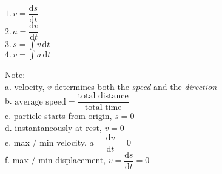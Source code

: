 \documentclass[10pt,landscape]{article}
\begin{document}
\begin{multicols}{3}
$1.\,v=\dfrac{\text{d}s}{\text{d}t}$\\[0.5\baselineskip]
$2.\,a=\dfrac{\text{d}v}{\text{d}t}$\\[0.5\baselineskip]
$3.\,s=\displaystyle\int v\,\text{d}t$\\[0.5\baselineskip]
$4.\,v=\displaystyle\int a\,\text{d}t$ 

Note:\\
a. velocity, $v$ determines both the \emph{speed} and the \emph{direction}\\
b. $\text{average speed}=\dfrac{\text{total distance}}{\text{total time}}$\\
c. particle starts from origin, $s = 0 $\\
d. instantaneously at rest, $v = 0$\\
e. max / min velocity, $a=\dfrac{\text{d}v}{\text{d}t}=0$\\
f. max / min displacement, $v=\dfrac{\text{d}s}{\text{d}t}=0$

\vfill

\end{multicols}
\end{document}
